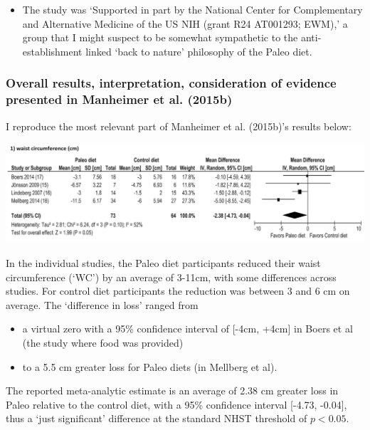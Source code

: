 \documentclass[]{tufte-handout}
\providecommand{\tightlist}{%
  \setlength{\itemsep}{0pt}\setlength{\parskip}{0pt}}
\begin{document}
\begin{itemize}
\tightlist
\item
  The study was `Supported in part by the National Center for
  Complementary and Alternative Medicine of the US NIH (grant R24
  AT001293; EWM),' a group that I might suspect to be somewhat
  sympathetic to the anti-establishment linked `back to nature'
  philosophy of the Paleo diet.
\end{itemize}

\hypertarget{overall-results-interpretation-consideration-of-evidence-presented-in-manheimerpaleolithicnutritionmetabolic2015}{%
\subsubsection{Overall results, interpretation, consideration of
evidence presented in Manheimer et al.
(2015b)}\label{overall-results-interpretation-consideration-of-evidence-presented-in-manheimerpaleolithicnutritionmetabolic2015}}

I reproduce the most relevant part of Manheimer et al. (2015b)'s results
below:

\includegraphics{waist_manheim.png}

In the individual studies, the Paleo diet participants reduced their
waist circumference (`WC') by an average of 3-11cm, with some
differences across studies. For control diet participants the reduction
was between 3 and 6 cm on average. The `difference in loss' ranged from

\begin{itemize}
\tightlist
\item
  a virtual zero with a 95\% confidence interval of {[}-4cm, +4cm{]} in
  Boers et al (the study where food was provided)
\item
  to a 5.5 cm greater loss for Paleo diets (in Mellberg et al).
\end{itemize}

The reported meta-analytic estimate is an average of 2.38 cm greater
loss in Paleo relative to the control diet, with a 95\% confidence
interval {[}-4.73, -0.04{]}, thus a `just significant' difference at the
standard NHST threshold of \(p<0.05\).
\end{document}
